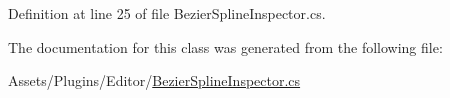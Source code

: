 Definition at line 25 of file Bezier\+Spline\+Inspector.\+cs.



The documentation for this class was generated from the following file\+:\begin{DoxyCompactItemize}
\item 
Assets/\+Plugins/\+Editor/\mbox{\hyperlink{_bezier_spline_inspector_8cs}{Bezier\+Spline\+Inspector.\+cs}}\end{DoxyCompactItemize}
